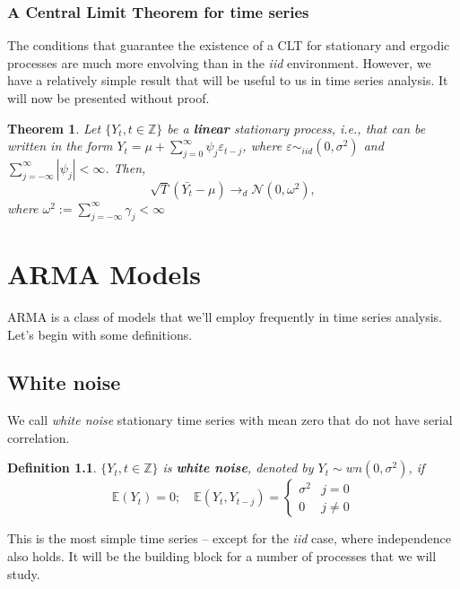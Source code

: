 \documentclass[11pt, a4paper]{report}
\theoremstyle{plain}
\newtheorem{thm}{Theorem}[section]
\theoremstyle{plain}
\newtheorem{defn}{Definition}[section]
\theoremstyle{remark}
\begin{document}
\subsection{A Central Limit Theorem for time series}

The conditions that guarantee the existence of a CLT for stationary and ergodic processes are much more envolving than in the \textit{iid} environment. However, we have a relatively simple result that will be useful to us in time series analysis. It will now be presented without proof.

\begin{thm}
	Let $\{Y_t, t \in \mathbb{Z} \}$ be a \textbf{linear} stationary process, i.e., that can be written in the form $Y_t = \mu + \sum_{j=0}^{\infty} \psi_j \varepsilon_{t-j}$, where $\varepsilon \sim_{iid} (0, \sigma^2)$ and $\sum_{j = -\infty}^{\infty} | \psi_j | < \infty$. Then,
	$$ \sqrt{T}(\bar{Y_t}-\mu) \to_d \mathcal{N}(0, \omega^2), $$ 
	where $\omega^2 := \sum_{j = -\infty}^{\infty} \gamma_{j} < \infty $	
\end{thm}

\chapter{ARMA Models}

ARMA is a class of models that we'll employ frequently in time series analysis. Let's begin with some definitions.

\section{White noise}

We call \textit{white noise} stationary time series with mean zero that do not have serial correlation. 

\begin{defn}
	$\{Y_t, t \in \mathbb{Z} \}$ is \textbf{white noise}, denoted by $Y_t \sim wn(0,\sigma^2)$, if
	$$\mathbb{E}\left(Y_{t}\right)=0 ; \quad \mathbb{E}\left(Y_{t}, Y_{t-j}\right)=\left\{\begin{array}{ll}
		\sigma^{2} & j=0 \\
		0 & j \neq 0
	\end{array}\right.$$
\end{defn}

This is the most simple time series -- except for the \textit{iid} case, where independence also holds. It will be the building block for a number of processes that we will study.
\end{document}
